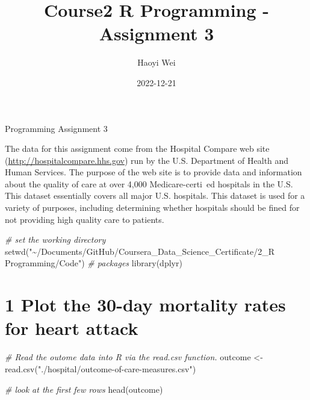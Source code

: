 \documentclass[
]{article}
\title{Course2 R Programming - Assignment 3}
\author{Haoyi Wei}
\date{2022-12-21}
\newenvironment{Shaded}{\begin{snugshade}}{\end{snugshade}}
\newcommand{\CommentTok}[1]{\textcolor[rgb]{0.56,0.35,0.01}{\textit{#1}}}
\newcommand{\FunctionTok}[1]{\textcolor[rgb]{0.00,0.00,0.00}{#1}}
\newcommand{\NormalTok}[1]{#1}
\newcommand{\OtherTok}[1]{\textcolor[rgb]{0.56,0.35,0.01}{#1}}
\newcommand{\StringTok}[1]{\textcolor[rgb]{0.31,0.60,0.02}{#1}}
\begin{document}
\maketitle



Programming Assignment 3

The data for this assignment come from the Hospital Compare web site
(\url{http://hospitalcompare.hhs.gov}) run by the U.S. Department of
Health and Human Services. The purpose of the web site is to provide
data and information about the quality of care at over 4,000
Medicare-certi ed hospitals in the U.S. This dataset essentially covers
all major U.S. hospitals. This dataset is used for a variety of
purposes, including determining whether hospitals should be fined for
not providing high quality care to patients.

\begin{Shaded}
\begin{Highlighting}[]
\CommentTok{\# set the working directory}
\FunctionTok{setwd}\NormalTok{(}\StringTok{"\textasciitilde{}/Documents/GitHub/Coursera\_Data\_Science\_Certificate/2\_R Programming/Code"}\NormalTok{)}
\CommentTok{\# packages}
\FunctionTok{library}\NormalTok{(dplyr)}
\end{Highlighting}
\end{Shaded}

\hypertarget{plot-the-30-day-mortality-rates-for-heart-attack}{%
\section{1 Plot the 30-day mortality rates for heart
attack}\label{plot-the-30-day-mortality-rates-for-heart-attack}}

\begin{Shaded}
\begin{Highlighting}[]
\CommentTok{\# Read the outome data into R via the read.csv function.}
\NormalTok{outcome }\OtherTok{\textless{}{-}}\FunctionTok{read.csv}\NormalTok{(}\StringTok{"./hospital/outcome{-}of{-}care{-}measures.csv"}\NormalTok{)}
\end{Highlighting}
\end{Shaded}

\begin{Shaded}
\begin{Highlighting}[]
\CommentTok{\# look at the first few rows}
\FunctionTok{head}\NormalTok{(outcome)}
\end{Highlighting}
\end{Shaded}
\end{document}
